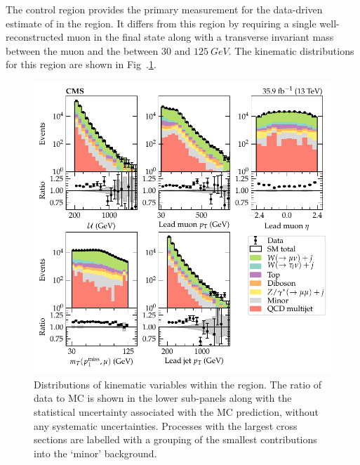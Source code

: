 The \muplusjets control region provides the primary measurement for the data-driven estimate of \IWlv in the \metplusjets region. It differs from this region by requiring a single well-reconstructed muon in the final state along with a transverse invariant mass between the muon and the \ptmiss between $30$ and $\SI{125}{GeV}$. The kinematic distributions for this region are shown in Fig~.\ref{fig:muplusjets}.
%
\begin{figure}[htb]
    \centering
    \includegraphics{chapters/042_backgrounds/images/singlemuon_dists.pdf}
    \caption[Single muon final state kinematics.]{
        Distributions of kinematic variables within the \muplusjets region. The ratio of data to MC is shown in the lower sub-panels along with the statistical uncertainty associated with the MC prediction, without any systematic uncertainties. Processes with the largest cross sections are labelled with a grouping of the smallest contributions into the `minor' background.
    }
    \label{fig:muplusjets}
\end{figure}
%

